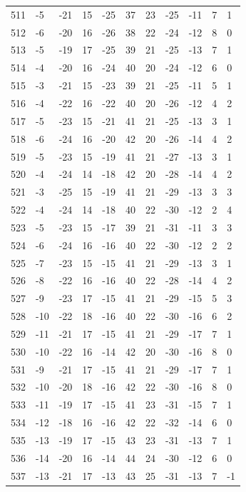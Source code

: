 \begin{table}[H]
\begin{tabular}{lllllllllll}
511 & -5 & -21 & 15 & -25 & 37 & 23 & -25 & -11 & 7 & 1 \\
512 & -6 & -20 & 16 & -26 & 38 & 22 & -24 & -12 & 8 & 0 \\
513 & -5 & -19 & 17 & -25 & 39 & 21 & -25 & -13 & 7 & 1 \\
514 & -4 & -20 & 16 & -24 & 40 & 20 & -24 & -12 & 6 & 0 \\
515 & -3 & -21 & 15 & -23 & 39 & 21 & -25 & -11 & 5 & 1 \\
516 & -4 & -22 & 16 & -22 & 40 & 20 & -26 & -12 & 4 & 2 \\
517 & -5 & -23 & 15 & -21 & 41 & 21 & -25 & -13 & 3 & 1 \\
518 & -6 & -24 & 16 & -20 & 42 & 20 & -26 & -14 & 4 & 2 \\
519 & -5 & -23 & 15 & -19 & 41 & 21 & -27 & -13 & 3 & 1 \\
520 & -4 & -24 & 14 & -18 & 42 & 20 & -28 & -14 & 4 & 2 \\
521 & -3 & -25 & 15 & -19 & 41 & 21 & -29 & -13 & 3 & 3 \\
522 & -4 & -24 & 14 & -18 & 40 & 22 & -30 & -12 & 2 & 4 \\
523 & -5 & -23 & 15 & -17 & 39 & 21 & -31 & -11 & 3 & 3 \\
524 & -6 & -24 & 16 & -16 & 40 & 22 & -30 & -12 & 2 & 2 \\
525 & -7 & -23 & 15 & -15 & 41 & 21 & -29 & -13 & 3 & 1 \\
526 & -8 & -22 & 16 & -16 & 40 & 22 & -28 & -14 & 4 & 2 \\
527 & -9 & -23 & 17 & -15 & 41 & 21 & -29 & -15 & 5 & 3 \\
528 & -10 & -22 & 18 & -16 & 40 & 22 & -30 & -16 & 6 & 2 \\
529 & -11 & -21 & 17 & -15 & 41 & 21 & -29 & -17 & 7 & 1 \\
530 & -10 & -22 & 16 & -14 & 42 & 20 & -30 & -16 & 8 & 0 \\
531 & -9 & -21 & 17 & -15 & 41 & 21 & -29 & -17 & 7 & 1 \\
532 & -10 & -20 & 18 & -16 & 42 & 22 & -30 & -16 & 8 & 0 \\
533 & -11 & -19 & 17 & -15 & 41 & 23 & -31 & -15 & 7 & 1 \\
534 & -12 & -18 & 16 & -16 & 42 & 22 & -32 & -14 & 6 & 0 \\
535 & -13 & -19 & 17 & -15 & 43 & 23 & -31 & -13 & 7 & 1 \\
536 & -14 & -20 & 16 & -14 & 44 & 24 & -30 & -12 & 6 & 0 \\
537 & -13 & -21 & 17 & -13 & 43 & 25 & -31 & -13 & 7 & -1 \\

\end{tabular}
\end{table}
